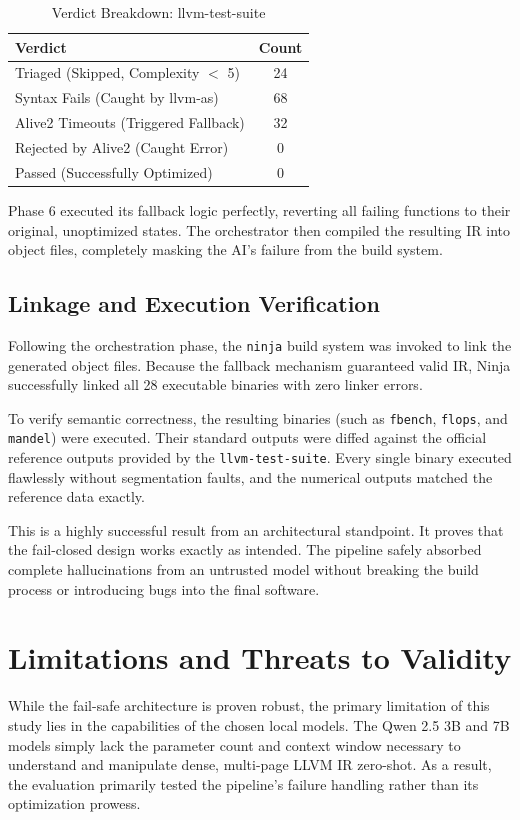 \documentclass[conference,10pt]{IEEEtran}
\begin{document}
\begin{table}[htbp]
\caption{Verdict Breakdown: llvm-test-suite}
\label{tab:verdicts}
\begin{center}
\begin{tabular}{|l|c|}
\hline
\textbf{Verdict} & \textbf{Count} \\
\hline
Triaged (Skipped, Complexity $<$ 5) & 24 \\
Syntax Fails (Caught by llvm-as) & 68 \\
Alive2 Timeouts (Triggered Fallback) & 32 \\
Rejected by Alive2 (Caught Error) & 0 \\
Passed (Successfully Optimized) & 0 \\
\hline
\end{tabular}
\end{center}
\end{table}

Phase 6 executed its fallback logic perfectly, reverting all failing functions to their original, unoptimized states. The orchestrator then compiled the resulting IR into object files, completely masking the AI's failure from the build system.

\subsection{Linkage and Execution Verification}
Following the orchestration phase, the \texttt{ninja} build system was invoked to link the generated object files. Because the fallback mechanism guaranteed valid IR, Ninja successfully linked all 28 executable binaries with zero linker errors.

To verify semantic correctness, the resulting binaries (such as \texttt{fbench}, \texttt{flops}, and \texttt{mandel}) were executed. Their standard outputs were diffed against the official reference outputs provided by the \texttt{llvm-test-suite}. Every single binary executed flawlessly without segmentation faults, and the numerical outputs matched the reference data exactly. 

This is a highly successful result from an architectural standpoint. It proves that the fail-closed design works exactly as intended. The pipeline safely absorbed complete hallucinations from an untrusted model without breaking the build process or introducing bugs into the final software.

\section{Limitations and Threats to Validity}
While the fail-safe architecture is proven robust, the primary limitation of this study lies in the capabilities of the chosen local models. The Qwen 2.5 3B and 7B models simply lack the parameter count and context window necessary to understand and manipulate dense, multi-page LLVM IR zero-shot. As a result, the evaluation primarily tested the pipeline's failure handling rather than its optimization prowess.
\end{document}
